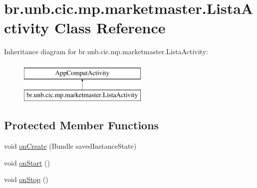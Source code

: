 \hypertarget{classbr_1_1unb_1_1cic_1_1mp_1_1marketmaster_1_1ListaActivity}{}\section{br.\+unb.\+cic.\+mp.\+marketmaster.\+Lista\+Activity Class Reference}
\label{classbr_1_1unb_1_1cic_1_1mp_1_1marketmaster_1_1ListaActivity}
Inheritance diagram for br.\+unb.\+cic.\+mp.\+marketmaster.\+Lista\+Activity\+:\begin{figure}[H]
\begin{center}
\leavevmode
\includegraphics[height=2.000000cm]{classbr_1_1unb_1_1cic_1_1mp_1_1marketmaster_1_1ListaActivity}
\end{center}
\end{figure}
\subsection*{Protected Member Functions}
\begin{DoxyCompactItemize}
\item 
void \mbox{\hyperlink{classbr_1_1unb_1_1cic_1_1mp_1_1marketmaster_1_1ListaActivity_aeddcd8e1aa9a40da81331e1cdef54823}{on\+Create}} (Bundle saved\+Instance\+State)
\item 
void \mbox{\hyperlink{classbr_1_1unb_1_1cic_1_1mp_1_1marketmaster_1_1ListaActivity_a1fdaf86635d197a70f0f579dfc40b2b9}{on\+Start}} ()
\item 
void \mbox{\hyperlink{classbr_1_1unb_1_1cic_1_1mp_1_1marketmaster_1_1ListaActivity_a6aad56519e2fd950c05183505e7ab021}{on\+Stop}} ()
\end{DoxyCompactItemize}
